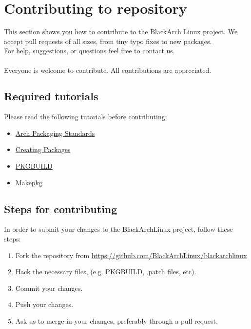 \documentclass[a4paper, oneside, 11pt]{book}
\begin{document}

\section{Contributing to repository}
This section shows you how to contribute to the BlackArch Linux project. We
accept pull requests of all sizes, from tiny typo fixes to new packages.\\For
help, suggestions, or questions feel free to contact us.
\\\\
Everyone is welcome to contribute. All contributions are appreciated.

\subsection{Required tutorials}
Please read the following tutorials before contributing:
\begin{itemize}
\item
\href{https://wiki.archlinux.org/index.php/Arch\_Packaging\_Standards)}{Arch
Packaging Standards}
\item \href{https://wiki.archlinux.org/index.php/Creating\_Packages}{Creating
Packages}
\item \href{https://wiki.archlinux.org/index.php/PKGBUILD}{PKGBUILD}
\item \href{https://wiki.archlinux.org/index.php/Makepkg}{Makepkg}
\end{itemize}

\subsection{Steps for contributing}
In order to submit your changes to the BlackArchLinux project, follow these
steps:
\begin{enumerate}
\item Fork the repository from
\url{https://github.com/BlackArchLinux/blackarchlinux}
\item Hack the necessary files, (e.g. PKGBUILD, .patch files, etc).
\item Commit your changes.
\item Push your changes.
\item Ask us to merge in your changes, preferably through a pull request.
\end{enumerate}
\end{document}
